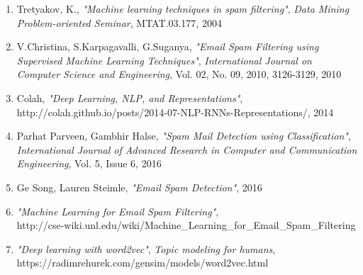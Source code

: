 \begin{enumerate}[1. ]
    \item Tretyakov, K., \textit{"Machine learning techniques in spam filtering"}, \textit{Data Mining Problem-oriented Seminar}, MTAT.03.177, 2004
    \item V.Christina, S.Karpagavalli, G.Suganya, \textit{"Email Spam Filtering using Supervised Machine Learning Techniques"}, \textit{ International Journal on Computer Science and Engineering}, Vol. 02, No. 09, 2010, 3126-3129, 2010
    \item Colah, \textit{"Deep Learning, NLP, and Representations"}, http://colah.github.io/posts/2014-07-NLP-RNNs-Representations/, 2014
    \item Parhat Parveen, Gambhir Halse, \textit{"Spam Mail Detection using Classification"}, \textit{International Journal of Advanced Research in Computer and Communication Engineering}, Vol. 5, Issue 6, 2016
    \item Ge Song, Lauren Steimle, \textit{"Email Spam Detection"}, 2016
    \item \textit{"Machine Learning for Email Spam Filtering"},\\ http://cse-wiki.unl.edu/wiki/Machine\_Learning\_for\_Email\_Spam\_Filtering
    \item \textit{"Deep learning with word2vec"}, \textit{Topic modeling for humans},\\https://radimrehurek.com/gensim/models/word2vec.html
\end{enumerate}